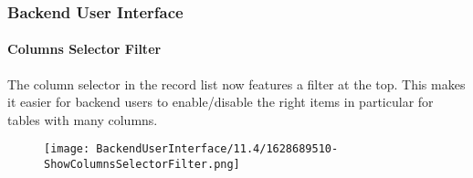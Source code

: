 %

\begin{frame}[fragile]
	\frametitle{Backend User Interface}
	\framesubtitle{Columns Selector Filter}

	The column selector in the record list now features a filter at the top.
	This makes it easier for backend users to enable/disable the right items
	in particular for tables with many columns.

	\begin{figure}
		\texttt{[image: BackendUserInterface/11.4/1628689510-ShowColumnsSelectorFilter.png]}
	\end{figure}

\end{frame}

